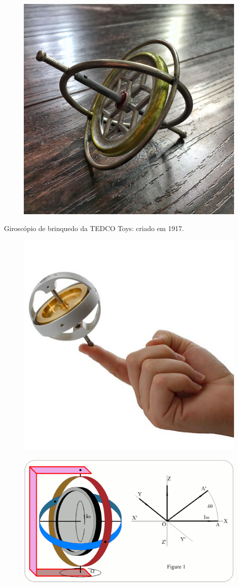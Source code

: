 \documentclass{beamer}
\begin{document}
\begin{frame}
\begin{figure}
\includegraphics[width=3.0 in]{figuras/Gyroscope.jpg}
\end{figure}
Giroscópio de brinquedo da TEDCO Toys: criado em 1917.
\end{frame}

\begin{frame}
\begin{figure}
\includegraphics[width=3.0 in]{figuras/gyro3.jpg}
\end{figure}
\end{frame}

\begin{frame}
\begin{figure}
\includegraphics[width=4.2 in]{figuras/G1a.png}
\end{figure}
\end{frame}
\end{document}
